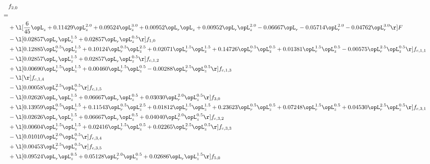 \begin{alignat}{2} 
\label{eq:f_20_1} 
& f_{2,0} \nonumber \\ 
 = \\ 
& + \l[ \frac{6}{45} \opL_z +  0.11429 \opL_z^{2.0} +  0.09524 \opL_z^{3.0} +  0.00952 \opL_r \opL_z +  0.00952 \opL_r \opL_z^{2.0}   -0.06667 \opL_r   -0.05714 \opL_r^{2.0}   -0.04762 \opL_r^{3.0}  \r] F \nonumber \\ 
& - \l[  0.02857 \opL_r \opL_z^{1.5} +  0.02857 \opL_r \opL_z^{0.5}  \r] f_{1,0} \nonumber \\ 
& + \l[  0.12885 \opL_r^{0.5} \opL_z^{1.5} +  0.10124 \opL_r^{0.5} \opL_z^{2.5} +  0.02071 \opL_r^{1.5} \opL_z^{1.5} +  0.14726 \opL_r^{0.5} \opL_z^{0.5} +  0.01381 \opL_r^{1.5} \opL_z^{0.5}   -0.00575 \opL_r^{2.5} \opL_z^{0.5}  \r] f_{c,1,1} \nonumber \\ 
& - \l[  0.02857 \opL_r \opL_z^{1.5} +  0.02857 \opL_r \opL_z^{0.5}  \r] f_{c,1,2} \nonumber \\ 
& + \l[  0.00690 \opL_r^{1.5} \opL_z^{1.5} +  0.00460 \opL_r^{1.5} \opL_z^{0.5}   -0.00288 \opL_r^{2.5} \opL_z^{0.5}  \r] f_{c,1,3} \nonumber \\ 
& - \l[  \r] f_{c,1,4} \nonumber \\ 
& - \l[  0.00058 \opL_r^{2.5} \opL_z^{0.5}  \r] f_{c,1,5} \nonumber \\ 
& - \l[  0.02626 \opL_r \opL_z^{1.5} +  0.06667 \opL_r \opL_z^{0.5} +  0.03030 \opL_r^{2.0} \opL_z^{0.5}  \r] f_{3,0} \nonumber \\ 
& + \l[  0.13959 \opL_r^{0.5} \opL_z^{1.5} +  0.11543 \opL_r^{0.5} \opL_z^{2.5} +  0.01812 \opL_r^{1.5} \opL_z^{1.5} +  0.23623 \opL_r^{0.5} \opL_z^{0.5} +  0.07248 \opL_r^{1.5} \opL_z^{0.5} +  0.04530 \opL_r^{2.5} \opL_z^{0.5}  \r] f_{c,3,1} \nonumber \\ 
& - \l[  0.02626 \opL_r \opL_z^{1.5} +  0.06667 \opL_r \opL_z^{0.5} +  0.04040 \opL_r^{2.0} \opL_z^{0.5}  \r] f_{c,3,2} \nonumber \\ 
& + \l[  0.00604 \opL_r^{1.5} \opL_z^{1.5} +  0.02416 \opL_r^{1.5} \opL_z^{0.5} +  0.02265 \opL_r^{2.5} \opL_z^{0.5}  \r] f_{c,3,3} \nonumber \\ 
& - \l[  0.01010 \opL_r^{2.0} \opL_z^{0.5}  \r] f_{c,3,4} \nonumber \\ 
& + \l[  0.00453 \opL_r^{2.5} \opL_z^{0.5}  \r] f_{c,3,5} \nonumber \\ 
& + \l[  0.09524 \opL_r \opL_z^{0.5} +  0.05128 \opL_r^{2.0} \opL_z^{0.5} +  0.02686 \opL_r \opL_z^{1.5}  \r] f_{5,0} \nonumber \\ 

\end{alignat}
